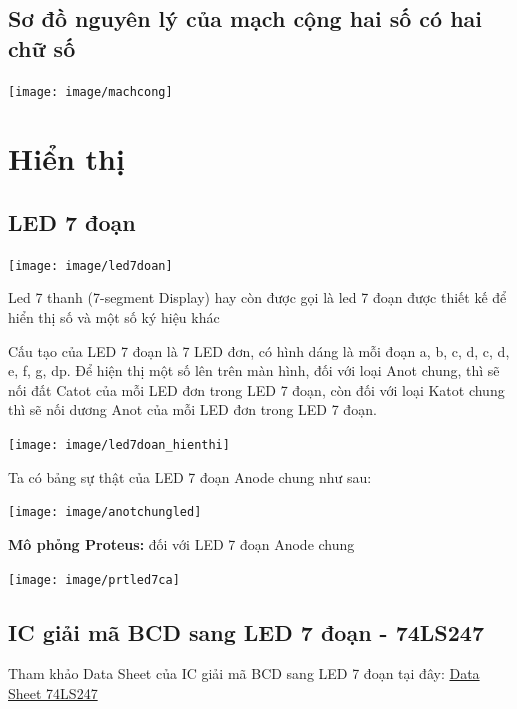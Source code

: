 \documentclass[10pt,a4paper]{report}
\begin{document}
\vspace{2cm}

\subsection{Sơ đồ nguyên lý của mạch cộng hai số có hai chữ số}
\begin{center}
	\texttt{[image: image/machcong]}
\end{center}

\newpage
\section{Hiển thị}
\subsection{LED 7 đoạn}
\begin{center}
	\texttt{[image: image/led7doan]}
\end{center}

Led 7 thanh (7-segment Display) hay còn được gọi là led 7 đoạn được thiết kế để hiển thị số và một số ký hiệu khác %

Cấu tạo của LED 7 đoạn là 7 LED đơn, có hình dáng là mỗi đoạn a, b, c, d, c, d, e, f, g, dp. Để hiện thị một số lên trên màn hình, đối với loại Anot chung, thì sẽ nối đất Catot của mỗi LED đơn trong LED 7 đoạn, còn đối với loại Katot chung thì sẽ nối dương Anot của mỗi LED đơn trong LED 7 đoạn.\\
\begin{center}
	\texttt{[image: image/led7doan\_hienthi]}
\end{center}

Ta có bảng sự thật của LED 7 đoạn Anode chung như sau:
\begin{center}
	\texttt{[image: image/anotchungled]}
\end{center}

\textbf{Mô phỏng Proteus: } đối với LED 7 đoạn Anode chung
\begin{center}
	\texttt{[image: image/prtled7ca]}
\end{center}

\vspace{2cm}
\subsection{IC giải mã BCD sang LED 7 đoạn - 74LS247}
Tham khảo Data Sheet của IC giải mã BCD sang LED 7 đoạn tại đây: \hyperref{https://pdf1.alldatasheet.com/datasheet-pdf/view/12641/ONSEMI/74LS247.html}{category}{name}{Data Sheet 74LS247} %
\end{document}
